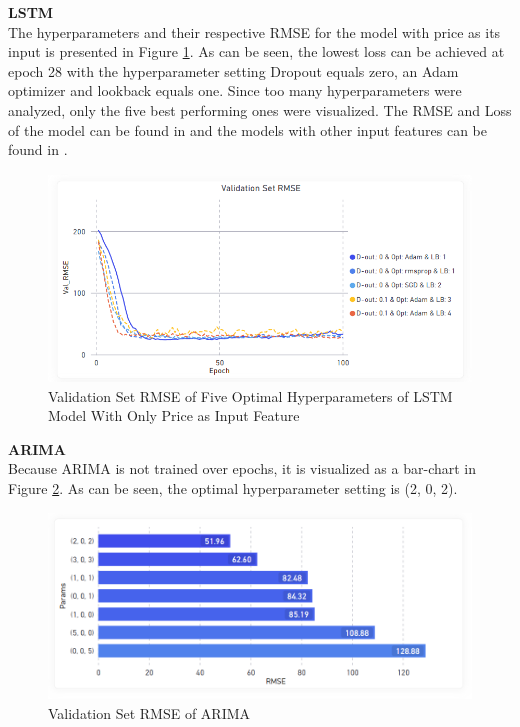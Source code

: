 \documentclass[11pt, a4paper]{article}
\begin{document}
\noindent\textbf{LSTM}\\
The hyperparameters and their respective RMSE for the model with price as its input is presented in Figure \ref{fig:lstm_price_rmse_best_params}. As can be seen, the lowest loss can be achieved
at epoch 28 with the hyperparameter setting Dropout equals zero, an Adam optimizer and lookback equals one. Since too many hyperparameters
were analyzed, only the five best performing ones were visualized. 
The RMSE and Loss of the model can be found in  and the models with other input features can be found in .
\begin{figure}[!h]
    \centering
    \includegraphics[width=\textwidth]{Only_Price_Params_RMSE_Validation_Set.png}
    \caption{Validation Set RMSE of Five Optimal Hyperparameters of LSTM Model With Only Price as Input Feature}
    \label{fig:lstm_price_rmse_best_params}
\end{figure}

\noindent\textbf{ARIMA}\\
Because ARIMA is not trained over epochs, it is visualized as a bar-chart in Figure \ref{fig:arima_rmse}. As can be seen, the optimal hyperparameter setting is (2, 0, 2).

\begin{figure}[!h]
    \centering
    \includegraphics[width=\textwidth]{ARIMA_RMSE.png}
    \caption{Validation Set RMSE of ARIMA}
    \label{fig:arima_rmse}
\end{figure}
\end{document}
